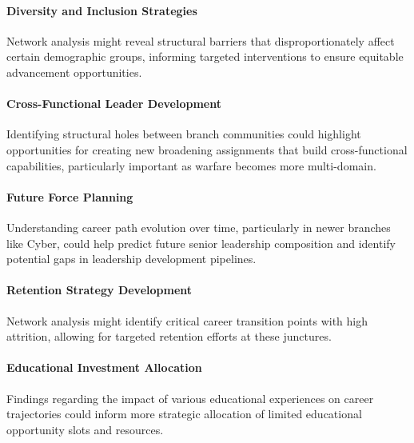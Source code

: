 \documentclass[../main.tex]{subfiles}
\begin{document}
\paragraph{Diversity and Inclusion Strategies} Network analysis might reveal structural barriers that disproportionately affect certain demographic groups, informing targeted interventions to ensure equitable advancement opportunities.

\paragraph{Cross-Functional Leader Development} Identifying structural holes between branch communities could highlight opportunities for creating new broadening assignments that build cross-functional capabilities, particularly important as warfare becomes more multi-domain.

\paragraph{Future Force Planning} Understanding career path evolution over time, particularly in newer branches like Cyber, could help predict future senior leadership composition and identify potential gaps in leadership development pipelines.

\paragraph{Retention Strategy Development} Network analysis might identify critical career transition points with high attrition, allowing for targeted retention efforts at these junctures.

\paragraph{Educational Investment Allocation} Findings regarding the impact of various educational experiences on career trajectories could inform more strategic allocation of limited educational opportunity slots and resources.



\end{document}
